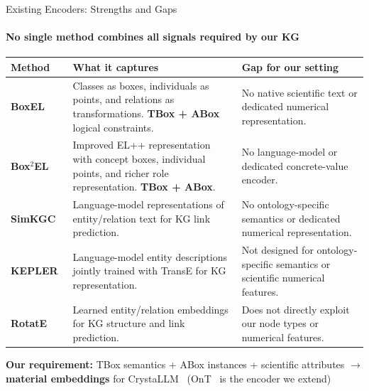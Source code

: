 \documentclass[aspectratio=169, 11pt]{beamer}
\begin{document}
\begin{frame}{Existing Encoders: Strengths and Gaps}
\framesubtitle{No single method combines all signals required by our KG}

\vspace{-0.05cm}

\begin{table}
    \centering
    \scriptsize
    \renewcommand{\arraystretch}{1.18}
    \begin{tabular}{p{2.7cm} p{5.7cm} p{5.2cm}}
        \toprule
        \textbf{Method} & \textbf{What it captures} & \textbf{Gap for our setting} \\
        \midrule

        \textbf{BoxEL}~\cite{xiong2022boxel} &
        Classes as boxes, individuals as points, and
        relations as transformations.
        \textbf{TBox + ABox} logical constraints. &
        No native scientific text or dedicated
        numerical representation. \\

        \textbf{Box$^2$EL}~\cite{jackermeier2024dual} &
        Improved EL++ representation with concept boxes,
        individual points, and richer role representation.
        \textbf{TBox + ABox}. &
        No language-model or dedicated
        concrete-value encoder. \\

        \textbf{SimKGC}~\cite{wang2022simkgc} &
        Language-model representations of entity/relation
        text for KG link prediction. &
        No ontology-specific semantics or
        dedicated numerical representation. \\

        \textbf{KEPLER}~\cite{wang2021kepler} &
        Language-model entity descriptions jointly trained
        with TransE for KG representation. &
        Not designed for ontology-specific semantics
        or scientific numerical features. \\

        \textbf{RotatE}~\cite{sun2019rotate} &
        Learned entity/relation embeddings for
        KG structure and link prediction. &
        Does not directly exploit our node types
        or numerical features. \\

        \bottomrule
    \end{tabular}
\end{table}

\vspace{0.15cm}

\begin{center}
{\small
\textbf{Our requirement:}\quad
TBox semantics + ABox instances + scientific attributes
$\rightarrow$ \textbf{material embeddings} for CrystaLLM~\cite{antunes2024crystallm}
(OnT~\cite{yang2025ont} is the encoder we extend)}
\end{center}

\end{frame}
\end{document}
